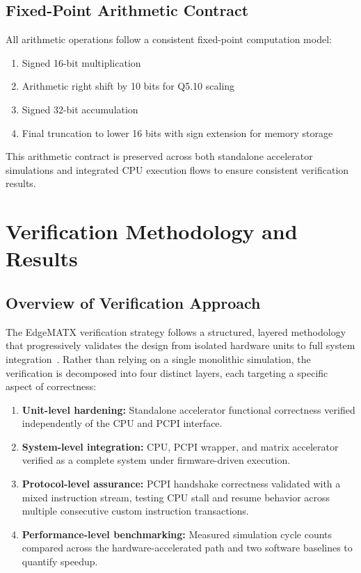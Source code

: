 ﻿\documentclass[12pt,a4paper]{report}
\begin{document}
\section{Fixed-Point Arithmetic Contract}

All arithmetic operations follow a consistent fixed-point computation model:

\begin{enumerate}
    \item Signed 16-bit multiplication
    \item Arithmetic right shift by 10 bits for Q5.10 scaling
    \item Signed 32-bit accumulation
    \item Final truncation to lower 16 bits with sign extension for memory storage
\end{enumerate}

This arithmetic contract is preserved across both standalone accelerator simulations and integrated CPU execution flows to ensure consistent verification results.
\chapter{Verification Methodology and Results}

\section{Overview of Verification Approach}

The EdgeMATX verification strategy follows a structured, layered methodology that progressively validates the design from isolated hardware units to full system integration~\cite{bergeron2003writing}.
Rather than relying on a single monolithic simulation, the verification is decomposed into four distinct layers, each targeting a specific aspect of correctness:

\begin{enumerate}
    \item \textbf{Unit-level hardening:} Standalone accelerator functional correctness verified independently of the CPU and PCPI interface.
    \item \textbf{System-level integration:} CPU, PCPI wrapper, and matrix accelerator verified as a complete system under firmware-driven execution.
    \item \textbf{Protocol-level assurance:} PCPI handshake correctness validated with a mixed instruction stream, testing CPU stall and resume behavior across multiple consecutive custom instruction transactions.
    \item \textbf{Performance-level benchmarking:} Measured simulation cycle counts compared across the hardware-accelerated path and two software baselines to quantify speedup.
\end{enumerate}
\end{document}
